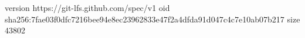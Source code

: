 version https://git-lfs.github.com/spec/v1
oid sha256:7fae03f0dfc7216bee94e8ec23962833e47f2a4dfda91d047c4c7e10ab07b217
size 43802
